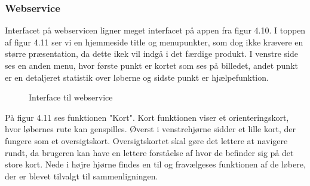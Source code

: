 \subsubsection{Webservice}
Interfacet på webservicen ligner meget interfacet på appen fra figur 4.10. I toppen af figur 4.11 ser vi en hjemmeside title og menupunkter, som dog ikke krævere en større præsentation, da dette ikek vil indgå i det færdige produkt. I venstre side ses en anden menu, hvor første punkt er kortet som ses på billedet, andet punkt er en detaljeret statistik over løberne og sidste punkt er hjælpefunktion.
\begin{figure}[h]
    \centering
    \caption{Interface til webservice}
\end{figure}

På figur 4.11 ses funktionen "Kort". Kort funktionen viser et orienteringskort, hvor løbernes rute kan genspilles. Øverst i venstrehjørne sidder et lille kort, der fungere som et oversigtskort. Oversigtskortet skal gøre det lettere at navigere rundt, da brugeren kan have en lettere forståelse af hvor de befinder sig på det store kort. Nede i højre hjørne findes en til og fravælgeses funktionen af de løbere, der er blevet tilvalgt til sammenligningen.

